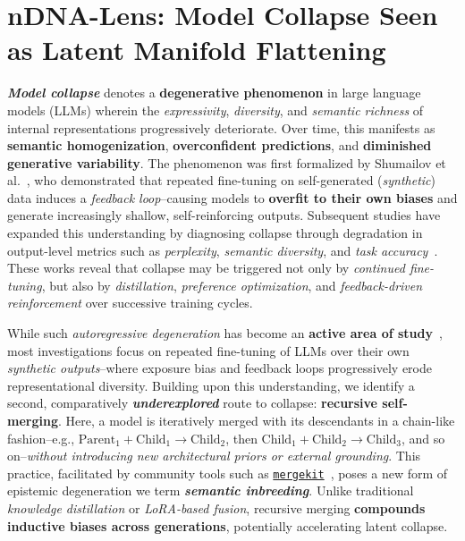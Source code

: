 \section{nDNA-Lens: Model Collapse Seen as Latent Manifold Flattening}

\textbf{\emph{Model collapse}} denotes a \textbf{degenerative phenomenon} in large language models (LLMs) wherein the \emph{expressivity}, \emph{diversity}, and \emph{semantic richness} of internal representations progressively deteriorate. Over time, this manifests as \textbf{semantic homogenization}, \textbf{overconfident predictions}, and \textbf{diminished generative variability}. The phenomenon was first formalized by Shumailov et al.~\cite{shumailov2023curse}, who demonstrated that repeated fine-tuning on self-generated (\emph{synthetic}) data induces a \emph{feedback loop}--causing models to \textbf{overfit to their own biases} and generate increasingly shallow, self-reinforcing outputs. Subsequent studies have expanded this understanding by diagnosing collapse through degradation in output-level metrics such as \textit{perplexity}, \textit{semantic diversity}, and \textit{task accuracy}~\citep{lee2023modelcollapse, xu2023aligning, rafailov2023direct}. These works reveal that collapse may be triggered not only by \emph{continued fine-tuning}, but also by \emph{distillation}, \emph{preference optimization}, and \emph{feedback-driven reinforcement} over successive training cycles.



While such \emph{autoregressive degeneration} has become an \textbf{active area of study}~\citep{shumailov2023curse, lee2023chatgpt, xu2023unleashing, liu2023lost}, most investigations focus on repeated fine-tuning of LLMs over their own \textit{synthetic outputs}--where exposure bias and feedback loops progressively erode representational diversity. Building upon this understanding, we identify a second, comparatively \textbf{\emph{underexplored}} route to collapse: \textbf{recursive self-merging}. Here, a model is iteratively merged with its descendants in a chain-like fashion--e.g., $\text{Parent}_1 + \text{Child}_1 \rightarrow \text{Child}_2$, then $\text{Child}_1 + \text{Child}_2 \rightarrow \text{Child}_3$, and so on--\emph{without introducing new architectural priors or external grounding}. This practice, facilitated by community tools such as \href{https://github.com/arcee-ai/mergekit}{\texttt{mergekit}}~\citep{mergekit2023}, poses a new form of epistemic degeneration we term \textbf{\textit{semantic inbreeding}}. Unlike traditional \textit{knowledge distillation} or \textit{LoRA-based fusion}, recursive merging \textbf{compounds inductive biases across generations}, potentially accelerating latent collapse.




